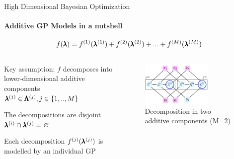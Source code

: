 \iffalse
\begin{frame}[c]{High Dimensional Bayesian Optimization}
\framesubtitle{Additive GP Models in a nutshell}
        \begin{equation*}
            f(\pmb{\lambda})=f^{(1)}(\pmb{\lambda}^{(1)})+f^{(2)}(\pmb{\lambda}^{(2)})+...+f^{(M)}(\pmb{\lambda}^{(M)})
        \end{equation*}
\begin{itemize}
\begin{columns}[T]
\begin{column}{0.45\linewidth}

\hspace{2em}
    \item Key assumption: $f$ decomposes into lower-dimensional additive components $\pmb{\lambda}^{(j)} \in \pmb{\Lambda}^{(j)}, j \in \{1,..,M\}$
    \item The decompositions are disjoint $\pmb{\lambda}^{(i)} \cap \pmb{\lambda}^{(j)} = \varnothing$
    \pause
    \item Each decomposition $f^{(j)}(\pmb{\lambda}^{(j)})$ is modelled by an individual GP
    \pause
    \end{column}
    \begin{column}{0.45\linewidth}
        \begin{figure}
    \includegraphics[width=0.7\textwidth]{images/highdim_images/additive-models.png}
    \caption{Decomposition in two additive components (M=2)} 
    \end{figure}
    \end{column}
\end{columns}
\end{itemize}
\end{frame}


